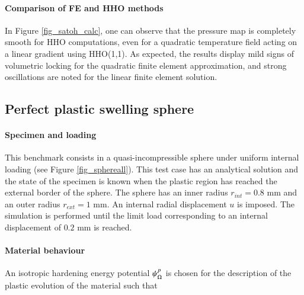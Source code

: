 \paragraph{Comparison of FE and HHO methods}

In Figure \ref{fig_satoh_calc}, one can observe that the pressure map is completely smooth for HHO computations, even for a quadratic temperature field acting on a linear gradient using HHO(1,1). As expected, the results display mild signs of volumetric locking for the quadratic finite element
approximation, and strong oscillations are noted for the linear finite element solution.

\subsection{Perfect plastic swelling sphere}
\label{sec_swelling_sphere}

\paragraph{Specimen and loading}

This benchmark consists in a quasi-incompressible sphere under uniform internal loading (see Figure \ref{fig_sphereall}).
This test case has an analytical solution and the state of the specimen is known when the plastic region has reached the external border of the sphere.
The sphere has an inner radius $r_{int} = 0.8$ mm and an outer
radius $r_{ext} = 1$ mm. An internal radial displacement $u$ is imposed.
The simulation is performed until the limit load corresponding to an internal displacement of $0.2$ mm is reached.

\paragraph{Material behaviour}

An isotropic hardening energy potential $\psi{}_{\Omega{}}^p$ is chosen for the description of the plastic evolution of the material such that


